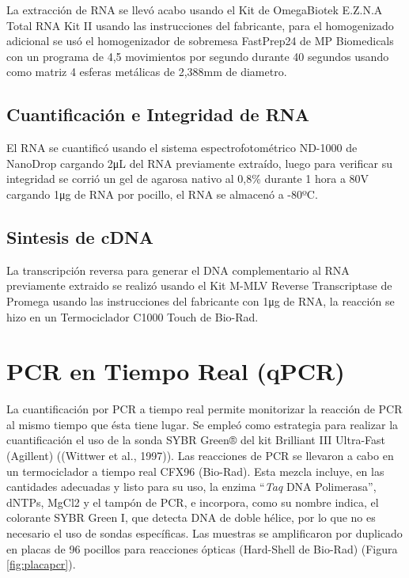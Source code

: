 \documentclass[12pt,a4paper,oneside]{scrbook}
\begin{document}
La extracción de RNA se llevó acabo usando el Kit de OmegaBiotek E.Z.N.A
Total RNA Kit II usando las instrucciones del fabricante, para el
homogenizado adicional se usó el homogenizador de sobremesa FastPrep24
de MP Biomedicals con un programa de 4,5 movimientos por segundo durante
40 segundos usando como matriz 4 esferas metálicas de 2,388mm de
diametro.

\subsection{Cuantificación e Integridad de RNA}

El RNA se cuantificó usando el sistema espectrofotométrico ND-1000 de
NanoDrop cargando 2\si{\micro\liter} del RNA previamente extraído, luego
para verificar su integridad se corrió un gel de agarosa nativo al 0,8\%
durante 1 hora a 80V cargando 1\si{\micro\gram} de RNA por pocillo, el
RNA se almacenó a -80ºC.

\subsection{Sintesis de cDNA}

La transcripción reversa para generar el DNA complementario al RNA
previamente extraido se realizó usando el Kit M-MLV Reverse
Transcriptase de Promega usando las instrucciones del fabricante con
1\si{\micro\gram} de RNA, la reacción se hizo en un Termociclador C1000
Touch de Bio-Rad.

\section{PCR en Tiempo Real (qPCR)}

La cuantificación por PCR a tiempo real permite monitorizar la reacción
de PCR al mismo tiempo que ésta tiene lugar. Se empleó como estrategia
para realizar la cuantificación el uso de la sonda SYBR Green® del kit
Brilliant III Ultra-Fast (Agillent) ((Wittwer et al., 1997)). Las
reacciones de PCR se llevaron a cabo en un termociclador a tiempo real
CFX96 (Bio-Rad). Esta mezcla incluye, en las cantidades adecuadas y
listo para su uso, la enzima ``\emph{Taq} DNA Polimerasa'', dNTPs, MgCl2
y el tampón de PCR, e incorpora, como su nombre indica, el colorante
SYBR Green I, que detecta DNA de doble hélice, por lo que no es
necesario el uso de sondas específicas. Las muestras se amplificaron por
duplicado en placas de 96 pocillos para reacciones ópticas (Hard-Shell
de Bio-Rad) (Figura \ref{fig:placapcr}).
\end{document}
